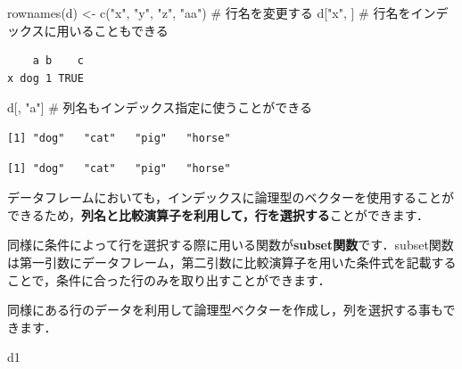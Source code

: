\documentclass[
  letterpaper,
  DIV=11,
  numbers=noendperiod]{scrreprt}
\newenvironment{Shaded}{\begin{snugshade}}{\end{snugshade}}
\newcommand{\CommentTok}[1]{\textcolor[rgb]{0.37,0.37,0.37}{#1}}
\newcommand{\FunctionTok}[1]{\textcolor[rgb]{0.28,0.35,0.67}{#1}}
\newcommand{\NormalTok}[1]{\textcolor[rgb]{0.00,0.23,0.31}{#1}}
\newcommand{\OtherTok}[1]{\textcolor[rgb]{0.00,0.23,0.31}{#1}}
\newcommand{\SpecialCharTok}[1]{\textcolor[rgb]{0.37,0.37,0.37}{#1}}
\newcommand{\StringTok}[1]{\textcolor[rgb]{0.13,0.47,0.30}{#1}}
\begin{document}
\begin{Shaded}
\begin{Highlighting}[]
\FunctionTok{rownames}\NormalTok{(d) }\OtherTok{\textless{}{-}} \FunctionTok{c}\NormalTok{(}\StringTok{"x"}\NormalTok{, }\StringTok{"y"}\NormalTok{, }\StringTok{"z"}\NormalTok{, }\StringTok{"aa"}\NormalTok{) }\CommentTok{\# 行名を変更する}
\NormalTok{d[}\StringTok{"x"}\NormalTok{, ] }\CommentTok{\# 行名をインデックスに用いることもできる}
\end{Highlighting}
\end{Shaded}

\begin{verbatim}
    a b    c
x dog 1 TRUE
\end{verbatim}

\begin{Shaded}
\begin{Highlighting}[]
\NormalTok{d[, }\StringTok{"a"}\NormalTok{] }\CommentTok{\# 列名もインデックス指定に使うことができる}
\end{Highlighting}
\end{Shaded}

\begin{verbatim}
[1] "dog"   "cat"   "pig"   "horse"
\end{verbatim}

\begin{Shaded}
\end{Shaded}

\begin{verbatim}
[1] "dog"   "cat"   "pig"   "horse"
\end{verbatim}

データフレームにおいても，インデックスに論理型のベクターを使用することができるため，\textbf{列名と比較演算子を利用して，行を選択する}ことができます．

同様に条件によって行を選択する際に用いる関数が\textbf{subset関数}です．subset関数は第一引数にデータフレーム，第二引数に比較演算子を用いた条件式を記載することで，条件に合った行のみを取り出すことができます．

同様にある行のデータを利用して論理型ベクターを作成し，列を選択する事もできます．

\begin{Shaded}
\begin{Highlighting}[]
\NormalTok{d1}
\end{Highlighting}
\end{Shaded}
\end{document}

